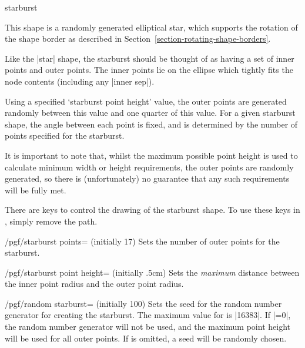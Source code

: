 \begin{shape}{starburst}

	This shape is a randomly generated elliptical star,
	which supports the rotation of the shape border as described in
	Section~\ref{section-rotating-shape-borders}.
\begin{codeexample}[]
\end{codeexample}	
	Like the |star| shape, the starburst should be thought of as having a set
	of inner points and outer points. The inner points lie on the ellipse
	which tightly fits the node contents (including any |inner sep|).
	
	Using a specified `starburst point height' value, the outer points
	are generated randomly between this value and one quarter of this
	value. For a given starburst shape, the angle between each point is
	fixed, and is determined by the number of points specified for
	the starburst.
	
	It is important to note that, whilst the maximum possible point
	height is used to calculate minimum width or height requirements,
	the outer points are randomly generated, so there is (unfortunately)
	no guarantee that any such requirements will be fully met.
	
\begin{codeexample}[]
\end{codeexample}

	There are \pgfname{} keys to control the drawing of the starburst
	shape. To use these keys in \tikzname,	simply remove the
		path.

	\begin{key}{/pgf/starburst points= (initially 17)}
		Sets the number of outer points for the starburst.
	\end{key}
	\begin{key}{/pgf/starburst point height= (initially .5cm)}
      Sets the \emph{maximum} distance between the inner point radius
      and the outer point radius.
	\end{key}
	
	\begin{key}{/pgf/random starburst= (initially 100)}
      Sets the seed for the random number generator for creating the
      starburst.  The maximum value for  is |16383|.
      If |=0|, the random number generator will not be
      used, and the maximum point height will be used for all outer
      points. If  is omitted, a seed will be randomly
      chosen.
	\end{key}
	

\end{shape}
